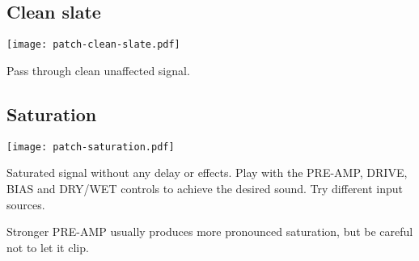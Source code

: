 \documentclass[11pt]{article}
\begin{document}
\noindent\begin{minipage}[t]{0.45\textwidth}\setlength{\parskip}{6pt}

\subsection{Clean slate}

\vspace{5mm}\begin{center}\texttt{[image: patch-clean-slate.pdf]}\vspace{5mm}\end{center}

Pass through clean unaffected signal.

\end{minipage}\begin{minipage}{0.05\textwidth}\phantom{ }\end{minipage}\begin{minipage}[t]{0.45\textwidth}\setlength{\parskip}{6pt}

\subsection{Saturation}

\vspace{5mm}\begin{center}\texttt{[image: patch-saturation.pdf]}\vspace{5mm}\end{center}

Saturated signal without any delay or effects. Play with the PRE-AMP, DRIVE,
BIAS and DRY/WET controls to achieve the desired sound. Try different input
sources.

Stronger PRE-AMP usually produces more pronounced saturation, but be careful
not to let it clip.

\end{minipage}
\end{document}
